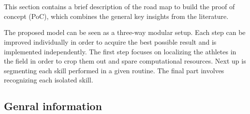 
\chapter{}%
\label{ch:methodologie}


This section contains a brief description of the road map to build the proof of concept (PoC), which combines the general key insights from the literature.

The proposed model can be seen as a three-way modular setup. Each step can be improved individually in order to acquire the best possible result and is implemented independently.
The first step focuses on localizing the athletes in the field in order to crop them out and spare computational resources. Next up is segmenting each skill performed in a given routine. The final part involves recognizing each isolated skill.


\section{Genral information}

